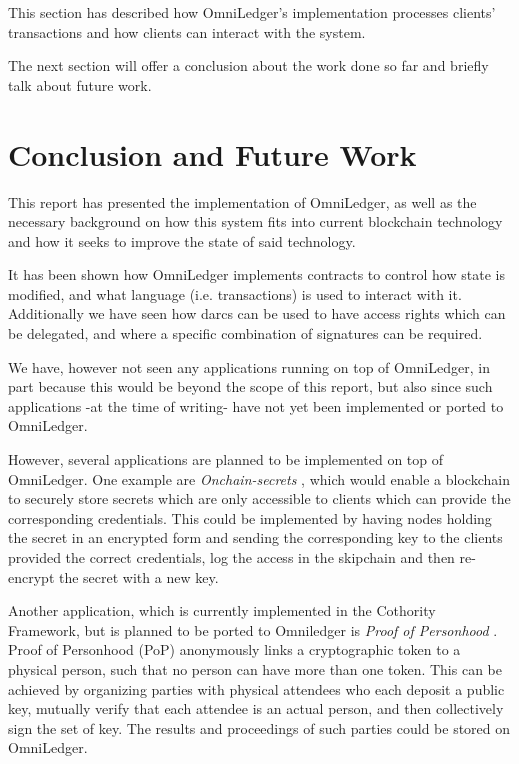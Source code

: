 \documentclass[11pt, a4paper, twoside, openright]{article} %
\begin{document}
This section has described how OmniLedger's implementation processes clients'
transactions and how clients can interact with the system. 

The next section will offer a conclusion about the work done so far and briefly
talk about future work.

\section{Conclusion and Future Work} \label{conclusion}

This report has presented the implementation of OmniLedger, as well as the
necessary background on how this system fits into current blockchain technology
and how it seeks to improve the state of said technology.

It has been shown how OmniLedger implements contracts to control how state is
modified, and what language (i.e. transactions) is used to interact with it.
Additionally we have seen how darcs can be used to have access rights which can
be delegated, and where a specific combination of signatures can be required.

We have, however not seen any applications running on top of OmniLedger, in
part because this would be beyond the scope of this report, but also since
such applications -at the time of writing- have not yet been implemented or
ported to OmniLedger.

However, several applications are planned to be implemented on top of
OmniLedger. One example are \textit{Onchain-secrets} \cite{kokorishidden},
which would enable a
blockchain to securely store secrets which are only accessible to clients
which can provide the corresponding credentials. This could be implemented by
having nodes holding the secret in an encrypted form and sending the
corresponding key to the clients provided the correct credentials, log the
access in the skipchain and then re-encrypt the secret with a new key.

Another application, which is currently implemented in the Cothority
Framework, but is planned to be ported to Omniledger is
\textit{Proof of Personhood} \cite{ford2007pseudonym}.
Proof of Personhood (PoP) anonymously links a
cryptographic token to a physical person, such that no person can have more
than one token. This can be achieved by organizing parties with physical
attendees who each deposit a public key, mutually verify that each attendee is
an actual person, and then collectively sign the set of key. 
The results and proceedings of such parties could be stored on OmniLedger.
\end{document}
